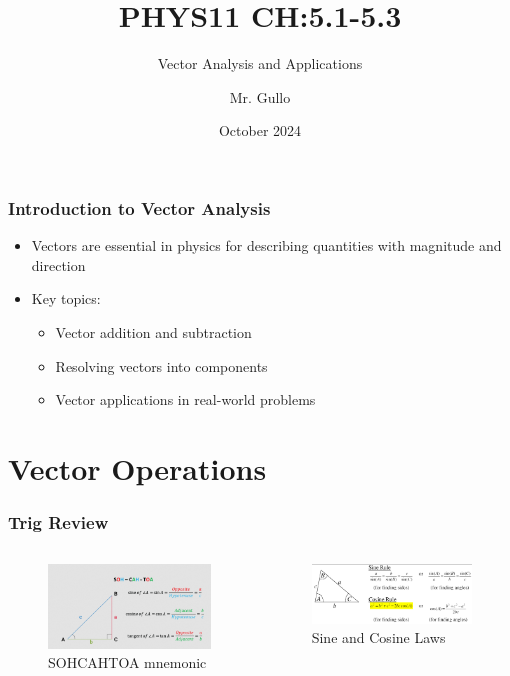 \documentclass{beamer}
\title[ Vector Analysis]{PHYS11 CH:5.1-5.3}
\subtitle{Vector Analysis and Applications }
\author[Mr. Gullo]{Mr. Gullo}
\date[Oct 2024]{October 2024}
\begin{document}
\frame{\titlepage}

\begin{frame}
\frametitle{Introduction to Vector Analysis}
\begin{itemize}
    \item Vectors are essential in physics for describing quantities with magnitude and direction
    \item Key topics:
    \begin{itemize}
        \item Vector addition and subtraction
        \item Resolving vectors into components
        \item Vector applications in real-world problems
    \end{itemize}
\end{itemize}
\end{frame}

\section{Vector Operations}

\begin{frame}
\frametitle{Trig Review}
\begin{columns}[T] %
    \begin{figure}
        \centering
        \includegraphics[width=\linewidth]{sohcahtoa.png}
        \caption{SOHCAHTOA mnemonic}
    \end{figure}

    \begin{figure}
        \centering
        \includegraphics[width=\linewidth]{sincoslaw.png}
        \caption{Sine and Cosine Laws}
    \end{figure}
\end{columns}
\end{frame}
\end{document}
